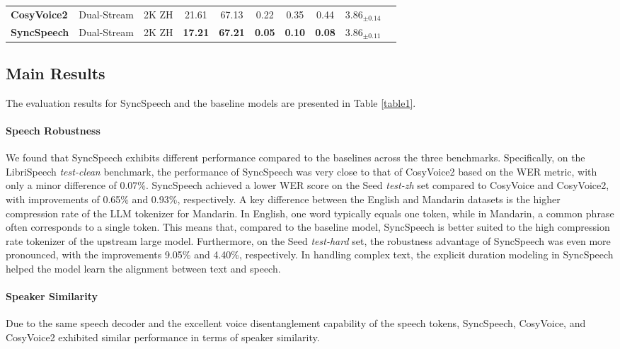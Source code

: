 \begin{table*}[t]
{\begin{tabular}{lccccccccc}
\textbf{CosyVoice2} & Dual-Stream  &2K ZH  & 21.61  & 67.13 &0.22 &0.35 &0.44      &$\text{3.86}_{\pm 0.14}$            \\
\textbf{SyncSpeech} & Dual-Stream &2K ZH  & \textbf{17.21}    & \textbf{67.21}  &\textbf{0.05} & \textbf{0.10} &\textbf{0.08} &$\text{3.86}_{\pm 0.11}$         \\
\bottomrule
\end{tabular}
}
\caption{The evaluation results of SyncSpeech and baseline models across the three benchmarks. * indicates the model trained on the large-scale dataset. Underline indicates the best performance in terms of WER and SS with the 585 hours training scale. \#Data refers to the used training dataset in hours.}
\label{table1}
\end{table*}


\subsection{Main Results}
The evaluation results for SyncSpeech and the baseline models are presented in Table \ref{table1}. 

\paragraph{Speech Robustness} 
We found that SyncSpeech exhibits different performance compared to the baselines across the three benchmarks. Specifically, on the LibriSpeech \textit{test-clean} benchmark, the performance of SyncSpeech was very close to that of CosyVoice2 based on the WER metric, with only a minor difference of 0.07\%. SyncSpeech achieved a lower WER score on the Seed \textit{test-zh} set compared to CosyVoice and CosyVoice2, with improvements of 0.65\% and 0.93\%, respectively.  A key difference between the English and Mandarin datasets is the higher compression rate of the LLM tokenizer for Mandarin. In English, one word typically equals one token, while in Mandarin, a common phrase often corresponds to a single token.
This means that, compared to the baseline model, SyncSpeech is better suited to the high compression rate tokenizer of the upstream large model. Furthermore, on the Seed \textit{test-hard} set, the robustness advantage of SyncSpeech was even more pronounced, with the improvements 9.05\% and 4.40\%, respectively. In handling complex text, the explicit duration modeling in SyncSpeech helped the model learn the alignment between text and speech.

\paragraph{Speaker Similarity} Due to the same speech decoder and the excellent voice disentanglement capability of the speech tokens, SyncSpeech, CosyVoice, and CosyVoice2 exhibited similar performance in terms of speaker similarity.
